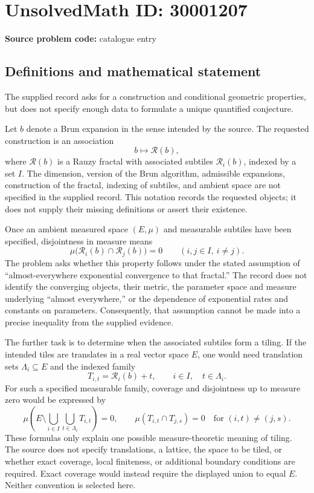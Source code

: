 \documentclass[11pt]{article}
\begin{document}
\section*{UnsolvedMath ID: 30001207}
\textbf{Source problem code:} catalogue entry
\subsection{Definitions and mathematical statement}
The supplied record asks for a construction and conditional geometric properties, but does not specify enough data to formulate a unique quantified conjecture.

Let \(b\) denote a Brun expansion in the sense intended by the source. The requested construction is an association
\[
 b\longmapsto\mathcal R(b),
\]
where \(\mathcal R(b)\) is a Rauzy fractal with associated subtiles \(\mathcal R_i(b)\), indexed by a set \(I\). The dimension, version of the Brun algorithm, admissible expansions, construction of the fractal, indexing of subtiles, and ambient space are not specified in the supplied record. This notation records the requested objects; it does not supply their missing definitions or assert their existence.

Once an ambient measured space \((E,\mu)\) and measurable subtiles have been specified, disjointness in measure means
\[
 \mu\bigl(\mathcal R_i(b)\cap\mathcal R_j(b)\bigr)=0
 \qquad(i,j\in I,\ i\ne j).
\]
The problem asks whether this property follows under the stated assumption of ``almost-everywhere exponential convergence to that fractal.'' The record does not identify the converging objects, their metric, the parameter space and measure underlying ``almost everywhere,'' or the dependence of exponential rates and constants on parameters. Consequently, that assumption cannot be made into a precise inequality from the supplied evidence.

The further task is to determine when the associated subtiles form a tiling. If the intended tiles are translates in a real vector space \(E\), one would need translation sets \(\Lambda_i\subseteq E\) and the indexed family
\[
 T_{i,t}=\mathcal R_i(b)+t,
 \qquad i\in I,\quad t\in\Lambda_i.
\]
For such a specified measurable family, coverage and disjointness up to measure zero would be expressed by
\[
 \mu\left(E\setminus\bigcup_{i\in I}\bigcup_{t\in\Lambda_i}T_{i,t}\right)=0,
 \qquad
 \mu(T_{i,t}\cap T_{j,s})=0
 \quad\text{for }(i,t)\ne(j,s).
\]
These formulas only explain one possible measure-theoretic meaning of tiling. The source does not specify translations, a lattice, the space to be tiled, or whether exact coverage, local finiteness, or additional boundary conditions are required. Exact coverage would instead require the displayed union to equal \(E\). Neither convention is selected here.
\end{document}
